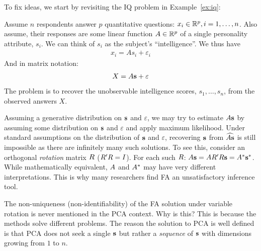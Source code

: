 \documentclass[12pt,a4paper]{article}
\begin{document}
To fix ideas, we start by revisiting the IQ problem in Example~\ref{ex:iq}:
\begin{example}
	
	Assume $n$ respondents answer $p$ quantitative questions: $x_i \in \mathbb{R}^p, i=1,\dots,n$. 
	Also assume, their responses are some linear function $A \in \mathbb{R}^p$ of a single personality attribute, $s_i$. 
	We can think of $s_i$ as the subject's ``intelligence''.
	We thus have 
	\begin{align}
	x_i = A s_i + \varepsilon_i
	\end{align}
	And in matrix notation:
	\begin{align}
	\label{eq:factor}
	X = A \mathbf{s} +\varepsilon
	\end{align}
	The problem is to recover the unobservable intelligence scores, $s_1,\dots,s_n$, from the observed answers $X$.	
\end{example}


Assuming a generative distribution on $\mathbf{s}$ and $\varepsilon$, we may try to estimate $A \mathbf{s}$ by assuming some distribution on $\mathbf{s}$ and $\varepsilon$ and apply maximum likelihood.
Under standard assumptions on the distribution of $\mathbf{s}$ and $\varepsilon$, recovering  $\mathbf{s}$ from $\widehat{A\mathbf{s}}$ is still impossible as there are infinitely many such solutions.
To see this, consider an orthogonal \emph{rotation} matrix $R$ ($R' R=I$). For each such $R$: $ A \mathbf{s}=A R' R \mathbf{s} = A^* \mathbf{s}^*$.
While mathematically equivalent, $A$ and $A^*$ may have very different interpretations. 
This is why many researchers find FA an unsatisfactory inference tool.

\begin{remark}
	The non-uniqueness (non-identifiability) of the FA solution under variable rotation is never mentioned in the PCA context. Why is this?
	This is because the methods solve different problems. 
	The reason the solution to PCA is well defined is that PCA does not seek a single $\mathbf{s}$ but rather a \emph{sequence} of $\mathbf{s}$ with dimensions growing from $1$ to $n$. 
\end{remark}
\end{document}
